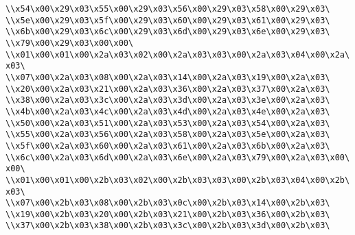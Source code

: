 \verb|\\x54\x00\x29\x03\x55\x00\x29\x03\x56\x00\x29\x03\x58\x00\x29\x03\|\newline
\verb|\\x5e\x00\x29\x03\x5f\x00\x29\x03\x60\x00\x29\x03\x61\x00\x29\x03\|\newline
\verb|\\x6b\x00\x29\x03\x6c\x00\x29\x03\x6d\x00\x29\x03\x6e\x00\x29\x03\|\newline
\verb|\\x79\x00\x29\x03\x00\x00\|\newline
\verb|\\x01\x00\x01\x00\x2a\x03\x02\x00\x2a\x03\x03\x00\x2a\x03\x04\x00\x2a\x03\|\newline
\verb|\\x07\x00\x2a\x03\x08\x00\x2a\x03\x14\x00\x2a\x03\x19\x00\x2a\x03\|\newline
\verb|\\x20\x00\x2a\x03\x21\x00\x2a\x03\x36\x00\x2a\x03\x37\x00\x2a\x03\|\newline
\verb|\\x38\x00\x2a\x03\x3c\x00\x2a\x03\x3d\x00\x2a\x03\x3e\x00\x2a\x03\|\newline
\verb|\\x4b\x00\x2a\x03\x4c\x00\x2a\x03\x4d\x00\x2a\x03\x4e\x00\x2a\x03\|\newline
\verb|\\x50\x00\x2a\x03\x51\x00\x2a\x03\x53\x00\x2a\x03\x54\x00\x2a\x03\|\newline
\verb|\\x55\x00\x2a\x03\x56\x00\x2a\x03\x58\x00\x2a\x03\x5e\x00\x2a\x03\|\newline
\verb|\\x5f\x00\x2a\x03\x60\x00\x2a\x03\x61\x00\x2a\x03\x6b\x00\x2a\x03\|\newline
\verb|\\x6c\x00\x2a\x03\x6d\x00\x2a\x03\x6e\x00\x2a\x03\x79\x00\x2a\x03\x00\x00\|\newline
\verb|\\x01\x00\x01\x00\x2b\x03\x02\x00\x2b\x03\x03\x00\x2b\x03\x04\x00\x2b\x03\|\newline
\verb|\\x07\x00\x2b\x03\x08\x00\x2b\x03\x0c\x00\x2b\x03\x14\x00\x2b\x03\|\newline
\verb|\\x19\x00\x2b\x03\x20\x00\x2b\x03\x21\x00\x2b\x03\x36\x00\x2b\x03\|\newline
\verb|\\x37\x00\x2b\x03\x38\x00\x2b\x03\x3c\x00\x2b\x03\x3d\x00\x2b\x03\|\newline
